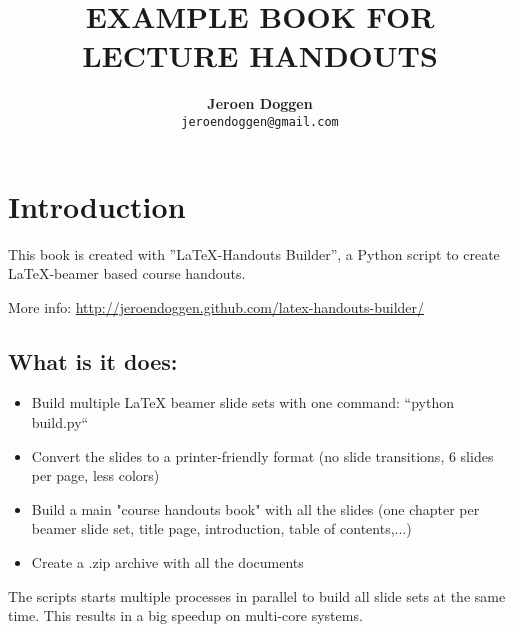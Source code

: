 \documentclass{book}
\title{\LARGE \textbf{\uppercase{ Example Book for Lecture  Handouts}}}
\author{\textbf{Jeroen Doggen}  \\
        \texttt{jeroendoggen@gmail.com}
}
\begin{document}
\maketitle
\tableofcontents

\chapter*{Introduction}
\label{chap_intro}

This book is created with ''\LaTeX -Handouts Builder'', a Python script to create \LaTeX-beamer based course handouts.

\noindent More info: \url{http://jeroendoggen.github.com/latex-handouts-builder/}


\section*{What is it does:}

\begin{itemize}
\item Build multiple LaTeX beamer slide sets with one command: ``python build.py``
\item Convert the slides to a printer-friendly format (no slide transitions, 6 slides per page, less colors)
\item Build a main "course handouts book" with all the slides (one chapter per beamer slide set, title page, introduction, table of contents,...)
\item Create a .zip archive with all the documents
\end{itemize}

\noindent The scripts starts multiple processes in parallel to build all slide sets at the same time. This results in a big speedup on multi-core systems.
\end{document}

